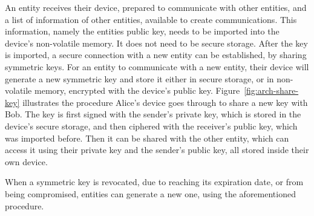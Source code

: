 An entity receives their device, prepared to communicate with other entities, and a list of information of other entities, available to create communications. This information, namely the entities public key, needs to be imported into the device's non-volatile memory. It does not need to be secure storage.
After the key is imported, a secure connection with a new entity can be established, by sharing symmetric keys.
For an entity to communicate with a new entity, their device will generate a new symmetric key and store it either in secure storage, or in non-volatile memory, encrypted with the device's public key. Figure~\ref{fig:arch-share-key} illustrates the procedure Alice's device goes through to share a new key with Bob. The key is first signed with the sender's private key, which is stored in the device's secure storage, and then ciphered with the receiver's public key, which was imported before. Then it can be shared with the other entity, which can access it using their private key and the sender's public key, all stored inside their own device.

When a symmetric key is revocated, due to reaching its expiration date, or from being compromised, entities can generate a new one, using the aforementioned procedure.
